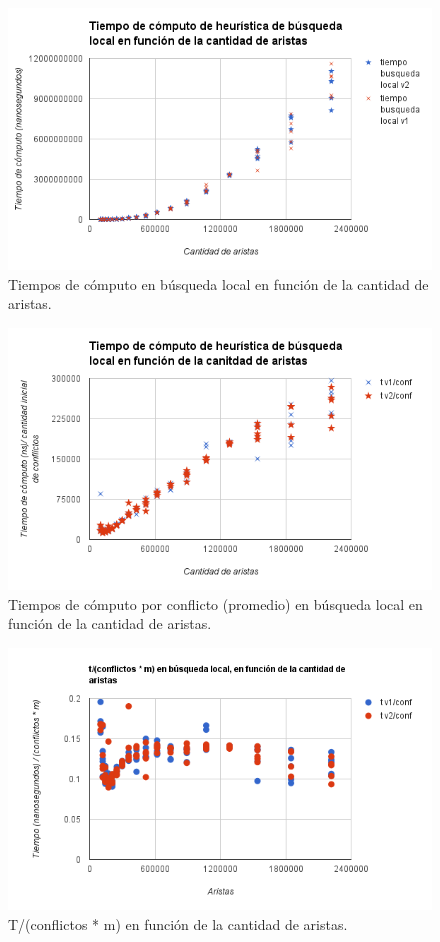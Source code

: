 \begin{figure}[]
	\centering
 	\includegraphics[width=18cm]{imagenes/Ej4/TvsAristas1.png}
	\caption{Tiempos de cómputo en búsqueda local en función de la cantidad de aristas.}
	\label{aristasEj4-1}
 \end{figure}
 
 \begin{figure}[]
	\centering
 	\includegraphics[width=18cm]{imagenes/Ej4/TvsAristas2.png}
	\caption{Tiempos de cómputo por conflicto (promedio) en búsqueda local en función de la cantidad de aristas.}
	\label{aristasEj4-2}
 \end{figure}
 
  \begin{figure}[]
	\centering
 	\includegraphics[width=18cm]{imagenes/Ej4/TvsAristas3.png}
	\caption{T/(conflictos * m) en función de la cantidad de aristas.}
	\label{aristasEj4-3}
 \end{figure}
 
